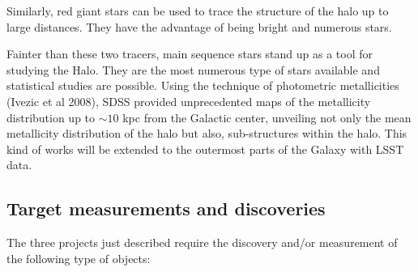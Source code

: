 Similarly, red giant stars can be used to trace the structure of the halo up to large
distances. They have the advantage 
of being bright and numerous stars. 

Fainter than these two tracers, main sequence stars stand up as a tool for studying
the Halo. They are the most numerous type of stars available and statistical studies 
are possible. Using the technique of photometric metallicities (Ivezic et al 2008), 
SDSS provided unprecedented maps of the metallicity distribution up to  $\sim 10$ 
kpc from the Galactic center, unveiling not only the mean metallicity distribution 
of the halo but also, sub-structures within the halo. This kind of works will be extended
to the outermost parts of the Galaxy with LSST data.



\subsection{Target measurements and discoveries}
\label{sec:keyword:MW_Halo_targets}

The three projects just described require the discovery and/or measurement of the following 
type of objects:

